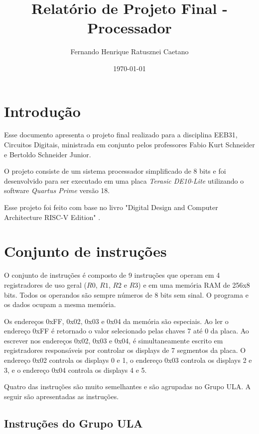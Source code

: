 \documentclass[a4paper, 12pt]{article}
\title{Relatório de Projeto Final - Processador}
\author{Fernando Henrique Ratusznei Caetano}
\date{\today}
\begin{document}
\maketitle
\tableofcontents

\newpage
\section{Introdução}

\par
Esse documento apresenta o projeto final realizado para a disciplina
EEB31, Circuitos Digitais, ministrada em conjunto pelos professores
Fabio Kurt Schneider e Bertoldo Schneider Junior.

\par
O projeto consiste de um sistema processador simplificado de 8 bits
e foi desenvolvido para ser executado em uma placa \textit{Terasic DE10-Lite}
utilizando o software \textit{Quartus Prime} versão 18.

\par
Esse projeto foi feito com base no livro "Digital Design and Computer Architecture RISC-V Edition" \cite{digdes}.

\newpage
\section{Conjunto de instruções}
\par
O conjunto de instruções é composto de 9 instruções que operam em 4
registradores de uso geral ($R0$, $R1$, $R2$ e $R3$) e em uma memória
RAM de 256x8 bits. Todos os operandos são sempre números de 8 bits sem
sinal. O programa e os dados ocupam a mesma memória.

Os endereços 0xFF, 0x02, 0x03 e 0x04 da memória são especiais.
Ao ler o endereço 0xFF é retornado o valor selecionado pelas chaves
7 até 0 da placa. Ao escrever nos endereços 0x02, 0x03 e 0x04, é simultaneamente
escrito em registradores responsáveis por controlar os displays de 7 segmentos
da placa. O endereço 0x02 controla os displays 0 e 1, o endereço 0x03 controla os 
displays 2 e 3, e o endereço 0x04 controla os displays 4 e 5.

Quatro das instruções são muito semelhantes e são agrupadas no Grupo ULA.
A seguir são apresentadas as instruções.

\subsection{Instruções do Grupo ULA}
\begin{table}[ht]
	\centering
	\caption{Formato das instruções codificadas no Grupo ULA}
	\label{tab:ula_format}
\end{table}
\end{document}
